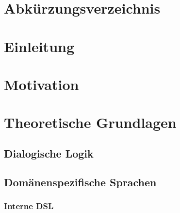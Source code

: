 \documentclass[11pt,a4paper,bibtotocnumbered]{scrreprt}
\begin{document}
\begin{singlespace}

\setcounter{page}{1}

\end{singlespace}


\tableofcontents
\listoffigures
\listoftables

\chapter*{Abkürzungsverzeichnis} 

\begin{acronym}[LAENGE]
\end{acronym}

\cleardoublepage





\chapter{Einleitung} %


\chapter{Motivation} %

\chapter{Theoretische Grundlagen} 

\section{Dialogische Logik} %

\section{Domänenspezifische Sprachen} %

\subsection{Interne DSL}
\end{document}
